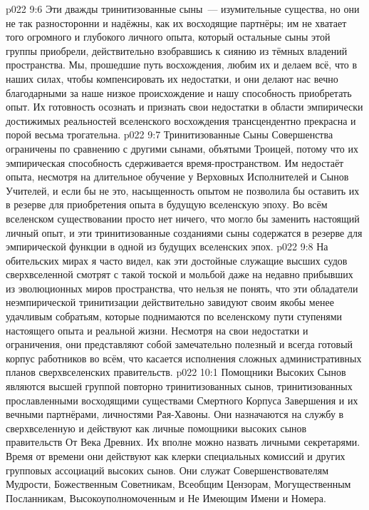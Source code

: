 \vs p022 9:6 Эти дважды тринитизованные сыны~--- изумительные существа, но они не так разносторонни и надёжны, как их восходящие партнёры; им не хватает того огромного и глубокого личного опыта, который остальные сыны этой группы приобрели, действительно взобравшись к сиянию из тёмных владений пространства. Мы, прошедшие путь восхождения, любим их и делаем всё, что в наших силах, чтобы компенсировать их недостатки, и они делают нас вечно благодарными за наше низкое происхождение и нашу способность приобретать опыт. Их готовность осознать и признать свои недостатки в области эмпирически достижимых реальностей вселенского восхождения трансцендентно прекрасна и порой весьма трогательна.
\vs p022 9:7 Тринитизованные Сыны Совершенства ограничены по сравнению с другими сынами, объятыми Троицей, потому что их эмпирическая способность сдерживается время\hyp{}пространством. Им недостаёт опыта, несмотря на длительное обучение у Верховных Исполнителей и Сынов Учителей, и если бы не это, насыщенность опытом не позволила бы оставить их в резерве для приобретения опыта в будущую вселенскую эпоху. Во всём вселенском существовании просто нет ничего, что могло бы заменить настоящий личный опыт, и эти тринитизованные созданиями сыны содержатся в резерве для эмпирической функции в одной из будущих вселенских эпох.
\vs p022 9:8 На обительских мирах я часто видел, как эти достойные служащие высших судов сверхвселенной смотрят с такой тоской и мольбой даже на недавно прибывших из эволюционных миров пространства, что нельзя не понять, что эти обладатели неэмпирической тринитизации действительно завидуют своим якобы менее удачливым собратьям, которые поднимаются по вселенскому пути ступенями настоящего опыта и реальной жизни. Несмотря на свои недостатки и ограничения, они представляют собой замечательно полезный и всегда готовый корпус работников во всём, что касается исполнения сложных административных планов сверхвселенских правительств.
\vs p022 10:1 Помощники Высоких Сынов являются высшей группой повторно тринитизованных сынов, тринитизованных прославленными восходящими существами Смертного Корпуса Завершения и их вечными партнёрами, личностями Рая\hyp{}Хавоны. Они назначаются на службу в сверхвселенную и действуют как личные помощники высоких сынов правительств От Века Древних. Их вполне можно назвать личными секретарями. Время от времени они действуют как клерки специальных комиссий и других групповых ассоциаций высоких сынов. Они служат Совершенствователям Мудрости, Божественным Советникам, Всеобщим Цензорам, Могущественным Посланникам, Высокоуполномоченным и Не Имеющим Имени и Номера.
